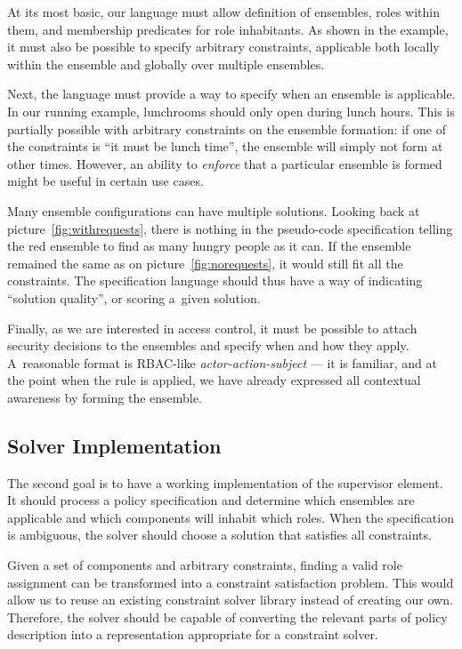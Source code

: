 At its most basic, our language must allow definition of ensembles, roles within them,
and membership predicates for role inhabitants. As shown in the example, it must also be
possible to specify arbitrary constraints, applicable both locally within the ensemble
and globally over multiple ensembles. 

Next, the language must provide a way to specify when an ensemble is applicable. In our
running example, lunchrooms should only open during lunch hours. This is partially
possible with arbitrary constraints on the ensemble formation: if one of the constraints
is ``it must be lunch time'', the ensemble will simply not form at other times. However,
an ability to \textit{enforce} that a particular ensemble is formed might be useful in
certain use cases.

Many ensemble configurations can have multiple solutions. Looking back at
picture~\ref{fig:withrequests}, there is nothing in the pseudo-code specification
telling the red ensemble to find as many hungry people as it can. If the ensemble
remained the same as on picture~\ref{fig:norequests}, it would still fit all the
constraints. The specification language should thus have a way of indicating ``solution
quality'', or scoring a~given solution.

Finally, as we are interested in access control, it must be possible to attach security
decisions to the ensembles and specify when and how they apply. A~reasonable format is
RBAC-like \textit{actor-action-subject} --- it is familiar, and at the point when the
rule is applied, we have already expressed all contextual awareness by forming the
ensemble.

\subsection{Solver Implementation}

The second goal is to have a working implementation of the supervisor element. It should
process a policy specification and determine which ensembles are applicable and which
components will inhabit which roles. When the specification is ambiguous, the solver
should choose a solution that satisfies all constraints.

Given a set of components and arbitrary constraints, finding a valid role assignment can
be transformed into a constraint satisfaction problem. This would allow us to reuse an
existing constraint solver library instead of creating our own. Therefore, the solver
should be capable of converting the relevant parts of policy description into a
representation appropriate for a constraint solver.

